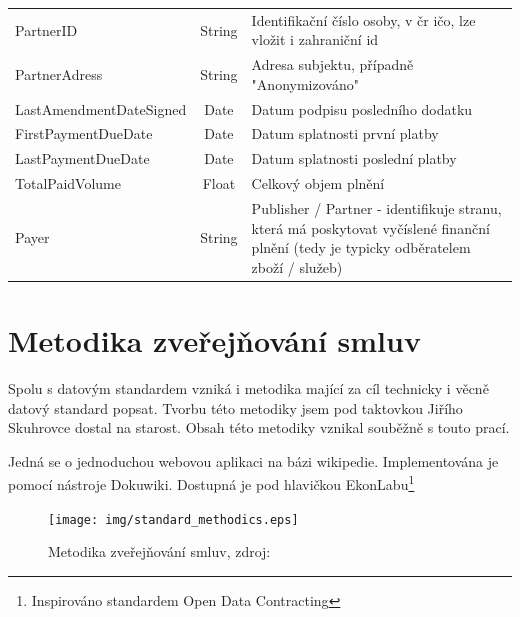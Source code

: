 \begin{center}
\begin{longtable}{lcp{65mm}}
\rowcolor{validateC}PartnerID & String & Identifikační číslo osoby, v čr ičo, lze vložit i zahraniční id \\
PartnerAdress & String & Adresa subjektu, případně "Anonymizováno" \\
LastAmendmentDateSigned & Date & Datum podpisu posledního dodatku \\
FirstPaymentDueDate & Date & Datum splatnosti první platby \\
LastPaymentDueDate & Date & Datum splatnosti poslední platby \\
TotalPaidVolume & Float & Celkový objem plnění \\
\rowcolor{validateC}Payer & String & Publisher / Partner - identifikuje stranu, která má poskytovat vyčíslené finanční plnění (tedy je typicky odběratelem zboží / služeb) \\
\end{longtable}
\end{center}

\newpage

\section{Metodika zveřejňování smluv}

Spolu s datovým standardem vzniká i metodika mající za cíl technicky i věcně datový standard popsat. Tvorbu této metodiky jsem pod taktovkou Jiřího Skuhrovce dostal na starost. Obsah této metodiky vznikal souběžně s touto prací.

Jedná se o jednoduchou webovou aplikaci na bázi wikipedie. Implementována je pomocí nástroje Dokuwiki\cite{dokuwiki}. Dostupná je pod hlavičkou EkonLabu\cite{metodika}\footnote{Inspirováno standardem Open Data Contracting\cite{ocds}}\\

\begin{figure}[h]
\centerline{\texttt{[image: img/standard\_methodics.eps]}}
\caption[Metodika zveřejňování smluv]{Metodika zveřejňování smluv, zdroj:\cite{metodika}}
\label{obr:standard_methodics}
\end{figure}


